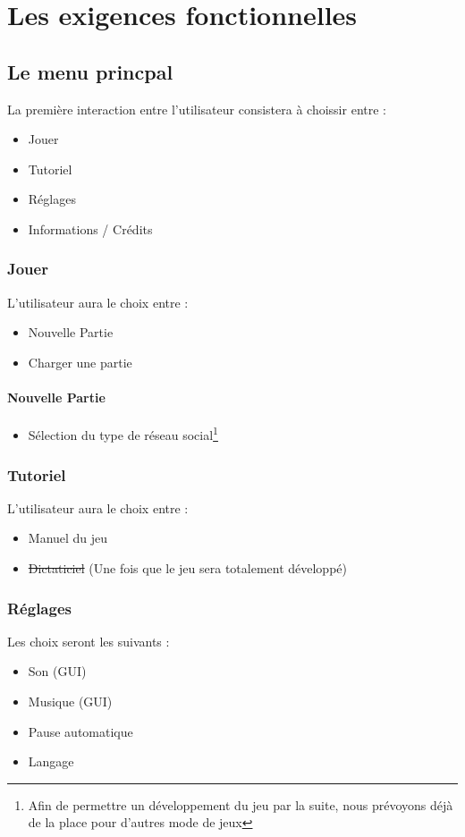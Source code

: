 \chapter{Les exigences fonctionnelles}
\label{sec:exigencesFonctionnelles}

\section{Le menu princpal}

La première interaction entre l'utilisateur consistera à choissir entre :

\begin{itemize}
    \item Jouer
    \item Tutoriel
    \item Réglages
    \item Informations / Crédits
\end{itemize}

\subsection{Jouer}
L'utilisateur aura le choix entre :
\begin{itemize}
    \item Nouvelle Partie
    \item Charger une partie
\end{itemize}
\subsubsection{Nouvelle Partie}
\begin{itemize}
    \item Sélection du type de réseau social\footnote{Afin de permettre un développement du jeu par la suite, nous prévoyons déjà de la place pour d'autres mode de jeux}
\end{itemize}

\subsection{Tutoriel}
L'utilisateur aura le choix entre :
\begin{itemize}
    \item Manuel du jeu
    \item \sout{Dictaticiel} (Une fois que le jeu sera totalement développé)
\end{itemize}
\clearpage
\subsection{Réglages}
Les choix seront les suivants :
\begin{itemize}
    \item Son (GUI)
    \item Musique (GUI)
    \item Pause automatique
    \item Langage
\end{itemize}

